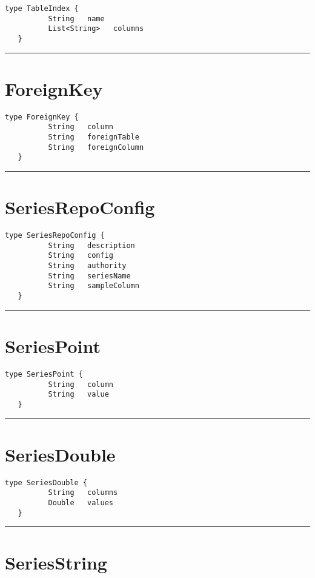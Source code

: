 \begin{lstlisting}[style=nonumbers]
   type TableIndex {
          String   name
          List<String>   columns
   }
\end{lstlisting}

\rule{12cm}{2pt}
\section{ForeignKey}
\label{type:ForeignKey}

\begin{lstlisting}[style=nonumbers]
   type ForeignKey {
          String   column
          String   foreignTable
          String   foreignColumn
   }
\end{lstlisting}

\rule{12cm}{2pt}
\section{SeriesRepoConfig}
\label{type:SeriesRepoConfig}

\begin{lstlisting}[style=nonumbers]
   type SeriesRepoConfig {
          String   description
          String   config
          String   authority
          String   seriesName
          String   sampleColumn
   }
\end{lstlisting}

\rule{12cm}{2pt}
\section{SeriesPoint}
\label{type:SeriesPoint}

\begin{lstlisting}[style=nonumbers]
   type SeriesPoint {
          String   column
          String   value
   }
\end{lstlisting}

\rule{12cm}{2pt}
\section{SeriesDouble}
\label{type:SeriesDouble}

\begin{lstlisting}[style=nonumbers]
   type SeriesDouble {
          String   columns
          Double   values
   }
\end{lstlisting}

\rule{12cm}{2pt}
\section{SeriesString}
\label{type:SeriesString}

